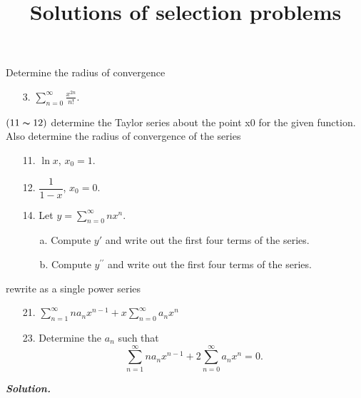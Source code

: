 \documentclass[12pt,a4paper]{article}
\title{Solutions of selection problems}
\newcommand{\bfit}[1]{%
    \textbf{\textit{#1}}}
\begin{document}
\fontsize{12pt}{20pt}\selectfont
Determine the radius of convergence
\begin{enumerate}
    \item[3.] $\displaystyle \sum_{n=0}^{\infty}\frac{x^{2n}}{n!}$.
\end{enumerate}
$(11 \thicksim 12)$ determine the Taylor series about the point x0 for the given function. Also determine the radius of convergence of the series
\begin{enumerate}
    \item[11.] $\ln x$, $x_0 = 1$.
    \item[12.] $\dfrac{1}{1-x}$, $x_0 = 0$.
    \item[14.] Let $\displaystyle y = \sum_{n=0}^{\infty}nx^n$.
    \begin{enumerate}
        \item[a.]Compute $y'$ and write out the first four terms of the series.
        \item[b.]Compute $y^{\prime\prime}$ and write out the first four terms of the series.
    \end{enumerate} 
\end{enumerate}
rewrite as a single power series 
\begin{enumerate}
    \item[21.] $\displaystyle \sum_{n=1}^{\infty}na_nx^{n - 1} + x \sum_{n=0}^{\infty}a_nx^n$
\end{enumerate}

\begin{enumerate}
    \item[23.] Determine the $a_n$ such that 
    \[
        \sum_{n = 1}^{\infty}n a_n x^{n - 1} + 2\sum_{n=0}^{\infty}a_n x^n = 0.
    \]
\end{enumerate}


\bfit{Solution.} 
\end{document}
